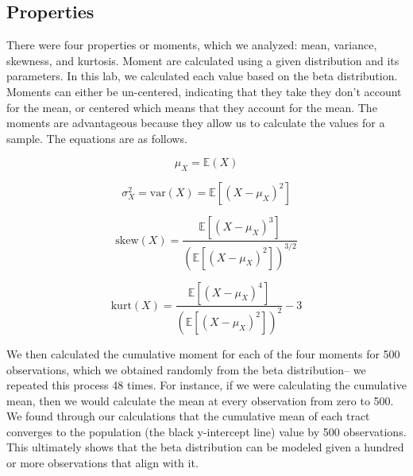 \documentclass{article}\usepackage[]{graphicx}\usepackage[]{xcolor}
\begin{document}
\begin{multicols}{2}
\section{Properties}
There were four properties or moments, which we analyzed: mean, variance, skewness, and kurtosis. Moment are calculated using a given distribution and its parameters. In this lab, we calculated each value based on the beta distribution. Moments can either be un-centered, indicating that they take they don't account for the mean, or centered which means that they account for the mean. The moments are advantageous because they allow us to calculate the values for a sample. The equations are as follows. 


\[
\mu_X = \mathbb{E}(X)
\]

\[
\sigma_X^2 = \mathrm{var}(X) = \mathbb{E} \left[ (X - \mu_X)^2 \right]
\]

\[
\mathrm{skew}(X) = \frac{\mathbb{E} \left[ (X - \mu_X)^3 \right]}{\left( \mathbb{E} \left[ (X - \mu_X)^2 \right] \right)^{3/2}}
\]

\[
\mathrm{kurt}(X) = \frac{\mathbb{E} \left[ (X - \mu_X)^4 \right]}{\left( \mathbb{E} \left[ (X - \mu_X)^2 \right] \right)^2} - 3
\]

We then calculated the cumulative moment for each of the four moments for 500 observations, which we obtained randomly from the beta distribution-- we repeated this process 48 times. For instance, if we were calculating the cumulative mean, then we would calculate the mean at every observation from zero to 500. We found through our calculations that the cumulative mean of each tract converges to the population (the black y-intercept line) value by 500 observations. 
This ultimately shows that the beta distribution can be modeled given a hundred or more observations that align with it. 


\end{multicols}
\end{document}
